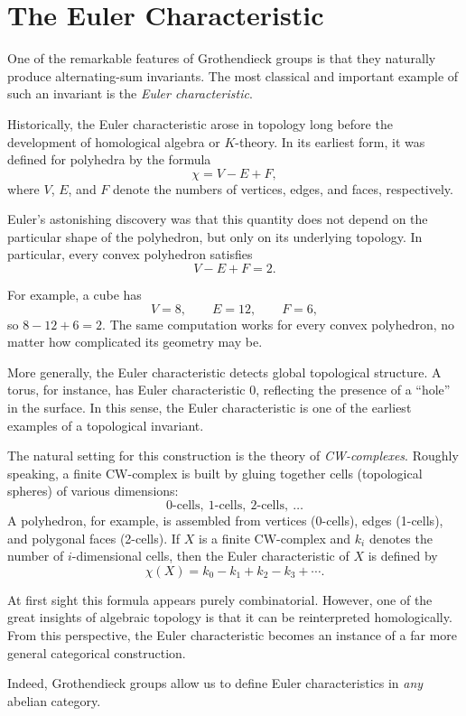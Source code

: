 \documentclass[12pt,reqno]{amsart}
\theoremstyle{plain}
\numberwithin{equation}{section}
\begin{document}
\section{The Euler Characteristic}

One of the remarkable features of Grothendieck groups is that they naturally produce alternating-sum invariants. The most classical and important example of such an invariant is the \emph{Euler characteristic}.

Historically, the Euler characteristic arose in topology long before the development of homological algebra or $K$-theory. In its earliest form, it was defined for polyhedra by the formula
\[
\chi = V-E+F,
\]
where $V$, $E$, and $F$ denote the numbers of vertices, edges, and faces, respectively.

Euler's astonishing discovery was that this quantity does not depend on the particular shape of the polyhedron, but only on its underlying topology. In particular, every convex polyhedron satisfies
\[
V-E+F=2.
\]

For example, a cube has
\[
V=8,\qquad E=12,\qquad F=6,
\]
so $8-12+6=2$.
The same computation works for every convex polyhedron, no matter how complicated its geometry may be.

More generally, the Euler characteristic detects global topological structure. A torus, for instance, has Euler characteristic $0$, reflecting the presence of a ``hole'' in the surface. In this sense, the Euler characteristic is one of the earliest examples of a topological invariant.

The natural setting for this construction is the theory of \emph{CW-complexes}. Roughly speaking, a finite CW-complex is built by gluing together cells (topological spheres) of various dimensions:
\[
0\text{-cells},\ 1\text{-cells},\ 2\text{-cells},\ \dots
\]
A polyhedron, for example, is assembled from vertices (0-cells), edges (1-cells), and polygonal faces (2-cells). 
If $X$ is a finite CW-complex and $k_i$ denotes the number of $i$-dimensional cells, then the Euler characteristic of $X$ is defined by
\[
\chi(X)=k_0-k_1+k_2-k_3+\cdots.
\]

At first sight this formula appears purely combinatorial. However, one of the great insights of algebraic topology is that it can be reinterpreted homologically. From this perspective, the Euler characteristic becomes an instance of a far more general categorical construction.

Indeed, Grothendieck groups allow us to define Euler characteristics in \emph{any} abelian category.
\end{document}
